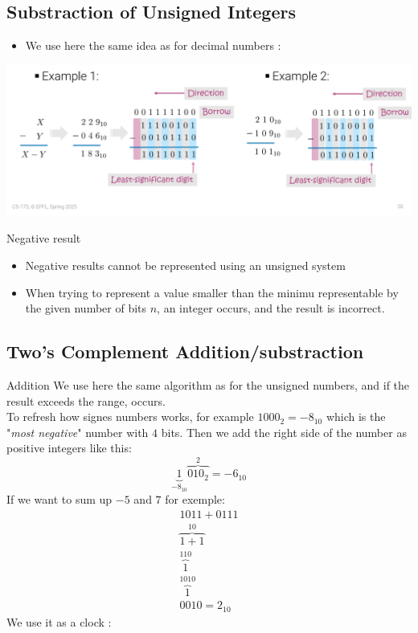 \subsection{Substraction of Unsigned Integers}
\begin{itemize}
    \item We use here the same idea as for decimal numbers : 
\end{itemize}
\begin{center}
    \includegraphics[scale=0.3]{Capture d’écran (113).png}
\end{center}
\begin{parag}{Negative result}
    \begin{itemize}
        \item Negative results cannot be represented using an unsigned system
        \item When trying to represent a value smaller than the minimu representable by the given number of bits $n$, an integer  occurs, and the result is incorrect.
    \end{itemize}
\end{parag}

\subsection{Two's Complement Addition/substraction}
\begin{parag}{Addition}
    We use here the same algorithm as for the unsigned numbers, and if the result exceeds the range,  occurs.
    \\
    To refresh how signes numbers works, for example $1000_2 = -8_{10}$ which is the "\textit{most negative}" number with $4$ bits. Then we add the right side of the number as positive integers like this:
    \[\underbrace{1}_{-8_{10}}\overbrace{010_2}^{2} = -6_{10}\]
    If we want to sum up $-5$ and $7$ for exemple:
    \begin{align*}
        1011 + 0111 \\
        \overbrace{1 + 1}^10\\
        \overbrace{1}^110 \\
        \overbrace{1}^1010 \\
        0010 = 2_{10}
    \end{align*}
    We use it as a clock : 
\end{parag}

